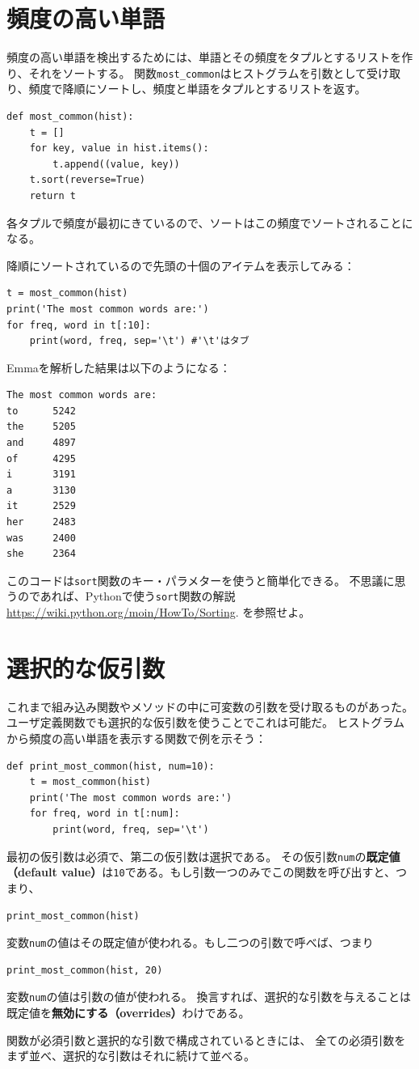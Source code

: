 \documentclass[a4j,12pt,makeidx]{jbook}
\begin{document}
\section{頻度の高い単語}
頻度の高い単語を検出するためには、単語とその頻度をタプルとするリストを作り、それをソートする。
関数{\tt most\_common}はヒストグラムを引数として受け取り、頻度で降順にソートし、頻度と単語をタプルとするリストを返す。
\begin{verbatim}
def most_common(hist):
    t = []
    for key, value in hist.items():
        t.append((value, key))
    t.sort(reverse=True)
    return t  
\end{verbatim}
各タプルで頻度が最初にきているので、ソートはこの頻度でソートされることになる。\par
降順にソートされているので先頭の十個のアイテムを表示してみる：
\begin{verbatim}
t = most_common(hist)
print('The most common words are:')
for freq, word in t[:10]:
    print(word, freq, sep='\t') #'\t'はタブ
\end{verbatim}
Emmaを解析した結果は以下のようになる：
\begin{verbatim}
The most common words are:
to      5242
the     5205
and     4897
of      4295
i       3191
a       3130
it      2529
her     2483
was     2400
she     2364
\end{verbatim}
\indent
このコードは{\tt sort}関数のキー・パラメターを使うと簡単化できる。
不思議に思うのであれば、Pythonで使う{\tt sort}関数の解説
\url{https://wiki.python.org/moin/HowTo/Sorting}.
を参照せよ。
%
\section{選択的な仮引数}
これまで組み込み関数やメソッドの中に可変数の引数を受け取るものがあった。
ユーザ定義関数でも選択的な仮引数を使うことでこれは可能だ。
ヒストグラムから頻度の高い単語を表示する関数で例を示そう：
\begin{verbatim}
def print_most_common(hist, num=10):
    t = most_common(hist)
    print('The most common words are:')
    for freq, word in t[:num]:
        print(word, freq, sep='\t')
\end{verbatim}
最初の仮引数は必須で、第二の仮引数は選択である。
その仮引数{\tt num}の{\bf 既定値（default value）}は{\tt 10}である。もし引数一つのみでこの関数を呼び出すと、つまり、
\begin{verbatim}
print_most_common(hist)
\end{verbatim}
変数{\tt num}の値はその既定値が使われる。もし二つの引数で呼べば、つまり
\begin{verbatim}
print_most_common(hist, 20)
\end{verbatim}
変数{\tt num}の値は引数の値が使われる。
換言すれば、選択的な引数を与えることは既定値を{\bf 無効にする（overrides）}わけである。 \par
関数が必須引数と選択的な引数で構成されているときには、
全ての必須引数をまず並べ、選択的な引数はそれに続けて並べる。
%
\end{document}
